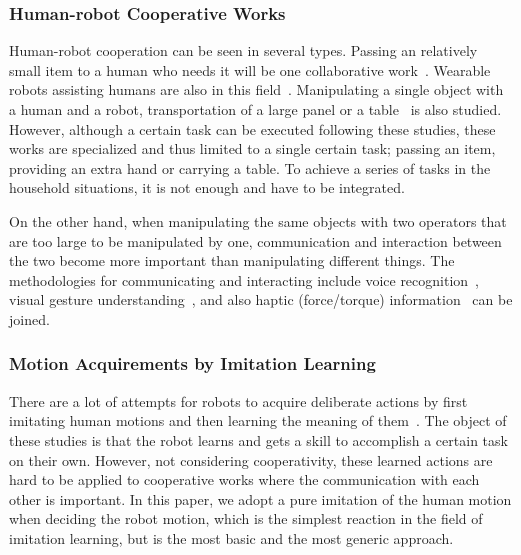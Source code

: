 \subsubsection{Human-robot Cooperative Works}
Human-robot cooperation can be seen in several types. Passing an relatively small item to a human who needs it will be one collaborative work~\cite{collaborative_primitives}\cite{handover_usage}. Wearable robots assisting humans are also in this field~\cite{wearable}\cite{exoskeleton}. Manipulating a single object with a human and a robot, transportation of a large panel or a table~\cite{aist_cooperative_carrying}\cite{carry_table} is also studied. However, although a certain task can be executed following these studies, these works are specialized and thus limited to a single certain task; passing an item, providing an extra hand or carrying a table. To achieve a series of tasks in the household situations, it is not enough and have to be integrated.

On the other hand, when manipulating the same objects with two operators that are too large to be manipulated by one, communication and interaction between the two become more important than manipulating different things. The methodologies for communicating and interacting include voice recognition~\cite{voice_recognition}, visual gesture understanding~\cite{gesture}\cite{gesture2}\cite{task_analysis}, and also haptic (force/torque) information~\cite{aist_cooperative_carrying}\cite{carry_table}\cite{carry_with_vision}\cite{cooperative_nao} can be joined.

\subsubsection{Motion Acquirements by Imitation Learning}
There are a lot of attempts for robots to acquire deliberate actions by first imitating human motions and then learning the meaning of them~\cite{folding_dl}. The object of these studies is that the robot learns and gets a skill to accomplish a certain task on their own. However, not considering cooperativity, these learned actions are hard to be applied to cooperative works where the communication with each other is important. In this paper, we adopt a pure imitation of the human motion when deciding the robot motion, which is the simplest reaction in the field of imitation learning, but is the most basic and the most generic approach.

